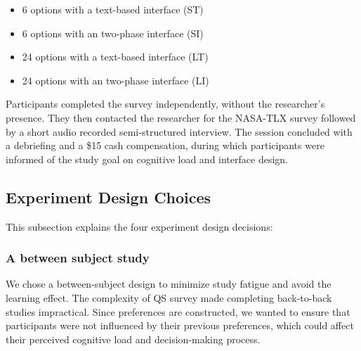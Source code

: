 \begin{itemize}
    \item 6 options with a text-based interface (ST)
    \item 6 options with an two-phase interface (SI)
    \item 24 options with a text-based interface (LT)
    \item 24 options with an two-phase interface (LI)
\end{itemize}

Participants completed the survey independently, without the researcher's presence. They then contacted the researcher for the NASA-TLX survey followed by a short audio recorded semi-structured interview. The session concluded with a debriefing and a \$15 cash compensation, during which participants were informed of the study goal on cognitive load and interface design.

\subsection{Experiment Design Choices}
This subsection explains the four experiment design decisions:

\subsubsection{A between subject study}
We chose a between-subject design to minimize study fatigue and avoid the learning effect. The complexity of QS survey made completing back-to-back studies impractical. Since preferences are constructed, we wanted to ensure that participants were not influenced by their previous preferences, which could affect their perceived cognitive load and decision-making process.


